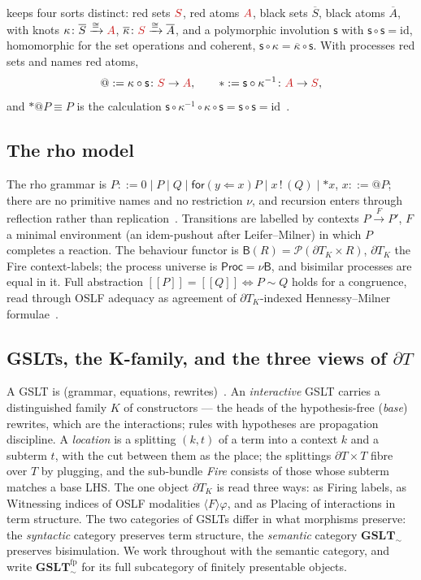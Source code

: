 \documentclass[11pt]{article}
\makeatletter
\newcommand{\sem}[1]{[\![#1]\!]}
\newcommand{\Proc}{\mathsf{Proc}}
\newcommand{\dT}{\partial T}
\newcommand{\GSLTsem}{\mathbf{GSLT}_{\!\sim}}
\newcommand{\GSLTfp}{\mathbf{GSLT}^{\mathrm{fp}}_{\!\sim}}
\newcommand{\Ps}{\mathcal{P}}
\newcommand{\Bfun}{\mathsf{B}}
\newcommand{\swap}{\mathsf{s}}
\newcommand{\id}{\mathrm{id}}
\newcommand{\for}[2]{\mathsf{for}(#1 \Leftarrow #2)}
\newcommand{\out}[2]{#1\,!\,(#2)}
\newcommand{\quo}[1]{@#1}
\newcommand{\drf}[1]{{*}#1}
\newcommand{\rc}[1]{\textcolor{redcopy}{#1}}   %
\newcommand{\Ss}{\rc{S}}
\newcommand{\As}{\rc{A}}
\newcommand{\bSs}{\overline{S}}
\newcommand{\bAs}{\overline{A}}
\theoremstyle{plain}
\theoremstyle{definition}
\theoremstyle{remark}
\makeatother
\begin{document}
\cite{knotrho} keeps four sorts distinct: red sets $\Ss$, red atoms $\As$, black sets $\bSs$, black
atoms $\bAs$, with knots $\kappa\colon\bSs\xrightarrow{\cong}\As$,
$\overline\kappa\colon\Ss\xrightarrow{\cong}\bAs$, and a polymorphic involution $\swap$ with
$\swap\circ\swap=\id$, homomorphic for the set operations and coherent,
$\swap\circ\kappa=\overline\kappa\circ\swap$. With processes red sets and names red atoms,
\begin{equation}\label{eq:quote}
\quo{}:=\kappa\circ\swap\colon\Ss\to\As,\qquad \drf{}:=\swap\circ\kappa^{-1}\colon\As\to\Ss,
\end{equation}
and $\drf{}\quo{}P\equiv P$ is the calculation
$\swap\circ\kappa^{-1}\circ\kappa\circ\swap=\swap\circ\swap=\id$~\cite[Prop.~6]{knotrho}.

\subsection{The rho model}

The rho grammar is $P::=0\mid P\mid Q\mid \for{y}{x}P\mid \out{x}{Q}\mid \drf{}x$, $x::=\quo{}P$;
there are no primitive names and no restriction $\nu$, and recursion enters through reflection rather
than replication~\cite[\S2]{knotrho}. Transitions are labelled by contexts $P\xrightarrow{F}P'$,
$F$ a minimal environment (an idem-pushout after Leifer--Milner) in which $P$ completes a reaction.
The behaviour functor is $\Bfun(R)=\Ps(\dT_K\times R)$, $\dT_K$ the Fire context-labels; the process
universe is $\Proc=\nu\Bfun$, and bisimilar processes are equal in it. Full abstraction
$\sem{P}=\sem{Q}\iff P\sim Q$ holds for a congruence, read through OSLF adequacy as agreement of
$\dT_K$-indexed Hennessy--Milner formulae~\cite[\S6]{knotrho}.

\subsection{GSLTs, the K-family, and the three views of \texorpdfstring{$\dT$}{dT}}

A GSLT is (grammar, equations, rewrites)~\cite{gsltnotes}. An \emph{interactive} GSLT carries a
distinguished family $K$ of constructors --- the heads of the hypothesis-free (\emph{base}) rewrites,
which are the interactions; rules with hypotheses are propagation discipline. A \emph{location} is a
splitting $(k,t)$ of a term into a context $k$ and a subterm $t$, with the cut between them as the
place; the splittings $\dT\times T$ fibre over $T$ by plugging, and the sub-bundle \emph{Fire}
consists of those whose subterm matches a base LHS. The one object $\dT_K$ is read three ways: as
Firing labels, as Witnessing indices of OSLF modalities $\langle F\rangle\varphi$, and as Placing of
interactions in term structure. The two categories of GSLTs differ in what morphisms preserve: the
\emph{syntactic} category preserves term structure, the \emph{semantic} category $\GSLTsem$ preserves
bisimulation. We work throughout with the semantic category, and write $\GSLTfp$ for its full
subcategory of finitely presentable objects.
\end{document}
